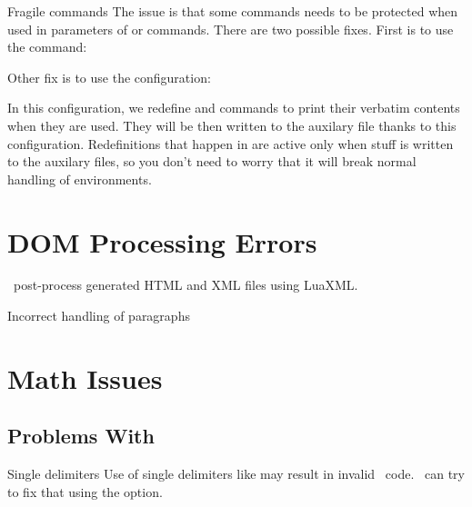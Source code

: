 \begin{issue}{Fragile commands}
The issue is that some commands needs to be protected when used in parameters of \texcommand{\section}
or \texcommand{\caption} commands. There are two possible fixes. First is to use the \texcommand{\protect}
command:

\begin{texsource}
\caption{$\protect\begin{array}{c c} hello & world\protect\end{array}$}
\end{texsource}

Other fix is to use the  configuration:

\begin{texsource}
\end{texsource}

In this configuration, we redefine \texcommand{\begin} and \texcommand{\end} commands to print
their verbatim contents when they are used. They will be then written to the auxilary file
thanks to this configuration.
Redefinitions that happen in  are active only when stuff is written to the auxilary
files, so you don't need to worry that it will break normal handling of environments.

\end{issue}

\section{DOM Processing Errors}
\label{faq:dom_processing}

\texfourht\ post-process generated HTML and XML files using LuaXML. 

\begin{issue}{Incorrect handling of paragraphs}

\end{issue}

\section{Math Issues}
\subsection{Problems With \term{\mathml}}

\begin{issue}{Single delimiters}
  Use of single delimiters like \texcommand{$\langle$} may result in invalid
  \mathml\ code. \texfourht\ can try to fix that using the 
  option.
\end{issue}



